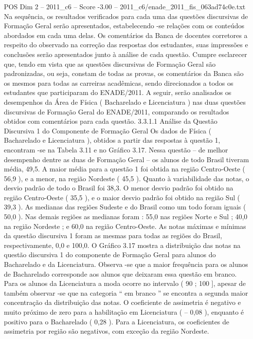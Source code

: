 \begin{textsample}{POS Dim 2 – 2011\_c6 – Score -3.00 – 2011\_c6/enade\_2011\_fis\_063ad74c0e.txt}
Na sequência, os resultados verificados para cada uma das questões discursivas de Formação Geral serão apresentados, estabelecendo -se relações com os conteúdos abordados em cada uma delas.
Os comentários da Banca de docentes corretores a respeito do observado na correção das respostas dos estudantes, suas impressões e conclusões serão apresentados junto à análise de cada questão.
Cumpre esclarecer que, tendo em vista que as questões discursivas de Formação Geral são padronizadas, ou seja, constam de todas as provas, os comentários da Banca são os mesmos para todas as carreiras acadêmicas, sendo direcionados a todos os estudantes que participaram do ENADE/2011.
A seguir, serão analisados os desempenhos da Área de Física ( Bacharelado e Licenciatura ) nas duas questões discursivas de Formação Geral do ENADE/2011, comparando os resultados obtidos com comentários para cada questão. 3.3.1.1 Análise da Questão Discursiva 1 do Componente de Formação Geral Os dados de Física ( Bacharelado e Licenciatura ), obtidos a partir das respostas à questão 1, encontram -se na Tabela 3.11 e no Gráfico 3.17.
Nessa questão – de melhor desempenho dentre as duas de Formação Geral – os alunos de todo Brasil tiveram média, 49,5.
A maior média para a questão 1 foi obtida na região Centro-Oeste ( 56,9 ), e a menor, na região Nordeste ( 45,5 ).
Quanto à variabilidade das notas, o desvio padrão de todo o Brasil foi 38,3.
O menor desvio padrão foi obtido na região Centro-Oeste ( 35,5 ), e o maior desvio padrão foi obtido na região Sul ( 39,3 ).
As medianas das regiões Sudeste e do Brasil como um todo foram iguais ( 50,0 ).
Nas demais regiões as medianas foram : 55,0 nas regiões Norte e Sul ; 40,0 na região Nordeste ; e 60,0 na região Centro-Oeste.
As notas máximas e mínimas da questão discursiva 1 foram as mesmas para todas as regiões do Brasil, respectivamente, 0,0 e 100,0.
O Gráfico 3.17 mostra a distribuição das notas na questão discursiva 1 do componente de Formação Geral para alunos do Bacharelado e da Licenciatura.
Observa -se que a maior frequência para os alunos de Bacharelado corresponde aos alunos que deixaram essa questão em branco.
Para os alunos da Licenciatura a moda ocorre no intervalo ( 90 ; 100 ], apesar de também observar -se que na categoria “ em branco ” se encontra a segunda maior concentração da distribuição das notas.
O coeficiente de assimetria é negativo e muito próximo de zero para a habilitação em Licenciatura ( – 0,08 ), enquanto é positivo para o Bacharelado ( 0,28 ).
Para a Licenciatura, os coeficientes de assimetria por região são negativos, com exceção da região Nordeste.

\end{textsample}

